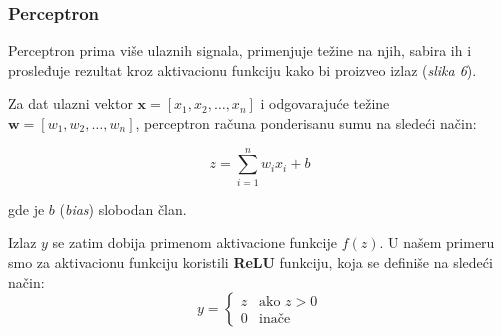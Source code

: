 \documentclass[12pt]{article}
\begin{document}
   \subsubsection*{Perceptron}
    \vspace{-0.5cm}
   Perceptron prima više ulaznih signala, primenjuje težine na njih, 
   sabira ih i prosleđuje rezultat kroz aktivacionu funkciju kako bi proizveo izlaz (\textit{slika 6}).
   
   Za dat ulazni vektor \(\mathbf{x} = [x_1, x_2, \ldots, x_n]\) i odgovarajuće težine 
   \(\mathbf{w} = [w_1, w_2, \ldots, w_n]\), perceptron računa ponderisanu sumu na sledeći način:
   
   \[
   z = \sum_{i=1}^{n} w_i x_i + b
   \]
   
   gde je \(b\) (\textit{bias}) slobodan član.
   
   Izlaz \(y\) se zatim dobija primenom aktivacione funkcije \(f(z)\). U našem primeru smo za
   aktivacionu funkciju koristili \textbf{ReLU} funkciju, koja se definiše na sledeći način:
   \[
      y = 
      \begin{cases}
         z & \text{ako } z > 0 \\
         0 & \text{inače}
      \end{cases}
      \]
      
\end{document}
